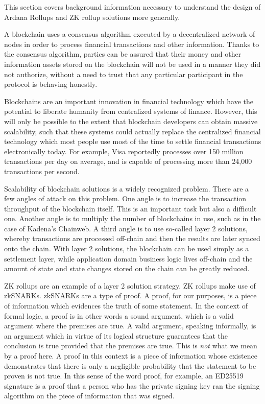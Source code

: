 \documentclass[12pt]{article}
\begin{document}
This section covers background information necessary to understand the design of Ardana Rollups and ZK rollup solutions more generally.

A blockchain uses a consensus algorithm executed by a decentralized network of nodes in order to process financial transactions and other information. Thanks to the consensus algorithm, parties can be assured that their money and other information assets stored on the blockchain will not be used in a manner they did not authorize, without a need to trust that any particular participant in the protocol is behaving honestly.

Blockchains are an important innovation in financial technology which have the potential to liberate humanity from centralized systems of finance. However, this will only be possible to the extent that blockchain developers can obtain massive scalability, such that these systems could actually replace the centralized financial technology which most people use most of the time to settle financial transactions electronically today. For example, Visa reportedly processes over 150 million transactions per day on average, and is capable of processing more than 24,000 transactions per second. \cite{visa}

Scalability of blockchain solutions is a widely recognized problem. There are a few angles of attack on this problem. One angle is to increase the transaction throughput of the blockchain itself. This is an important task but also a difficult one. Another angle is to multiply the number of blockchains in use, such as in the case of Kadena's Chainweb. \cite{chainweb} A third angle is to use so-called layer 2 solutions, whereby transactions are processed off-chain and then the results are later synced onto the chain. With layer 2 solutions, the blockchain can be used simply as a settlement layer, while application domain business logic lives off-chain and the amount of state and state changes stored on the chain can be greatly reduced.

ZK rollups are an example of a layer 2 solution strategy. ZK rollups make use of zkSNARKs. zkSNARKs are a type of proof. A proof, for our purposes, is a piece of information which evidences the truth of some statement. In the context of formal logic, a proof is in other words a sound argument, which is a valid argument where the premises are true. A valid argument, speaking informally, is an argument which in virtue of its logical structure guarantees that the conclusion is true provided that the premises are true. This is \emph{not}\/ what we mean by a proof here. A proof in this context is a piece of information whose existence demonstrates that there is only a negligible probability that the statement to be proven is not true. In this sense of the word proof, for example, an ED25519 signature is a proof that a person who has the private signing key ran the signing algorithm on the piece of information that was signed.
\end{document}
